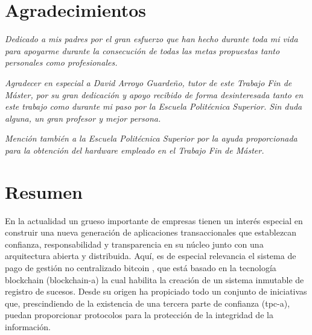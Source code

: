 \documentclass[12pt,a4paper, twoside]{report}
\newcommand{\blankpage}{
				\newpage
				\thispagestyle{empty}
				\mbox{}
				\newpage
				}
\begin{document}
	\chapter*{Agradecimientos}
	\thispagestyle{empty}
	\vspace{1cm}
	\begin{flushright}
			\textit{Dedicado a mis padres por el gran esfuerzo que han hecho durante toda mi vida para apoyarme durante la consecución de todas las metas propuestas tanto personales como profesionales.} 
			
		\vspace{1cm}	
		
			\textit{Agradecer en especial a David Arroyo Guardeño, tutor de este Trabajo Fin de Máster, por su gran dedicación y apoyo recibido de forma desinteresada tanto en este trabajo como durante mi paso por la Escuela Politécnica Superior. Sin duda alguna, un gran profesor y mejor persona.}
			
		\vspace{1cm}	
		
		\textit{Mención también a la Escuela Politécnica Superior por la ayuda proporcionada para la obtención del hardware empleado en el Trabajo Fin de Máster.}
	\end{flushright}
	
	\blankpage
	
	\chapter*{Resumen}
	\thispagestyle{empty}
	
	\vspace{-0.3cm}
	
	En la actualidad un grueso importante de empresas tienen un interés especial en construir una nueva generación de aplicaciones transaccionales que establezcan confianza, responsabilidad y transparencia en su núcleo junto con una arquitectura abierta y distribuida. Aquí, es de especial relevancia el sistema de pago de gestión no centralizado \gls{bitcoin} \cite{bitcoin}, que está basado en la tecnología \Gls{blockchain} (\gls{blockchain-a}) \cite{iansiti:2017:ttab} la cual habilita la creación de un sistema inmutable de registro de sucesos. Desde su origen ha propiciado todo un conjunto de iniciativas que, prescindiendo de la existencia de una tercera parte de confianza (\gls{tpc-a}), puedan proporcionar protocolos para la protección de la integridad de la información. \\
	
\end{document}
